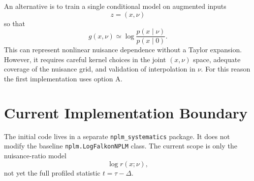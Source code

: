 \documentclass[11pt]{article}
\begin{document}
An alternative is to train a single conditional model on augmented inputs
\begin{equation}
  z=(x,\nu)
\end{equation}
so that
\begin{equation}
  g(x,\nu) \simeq \log \frac{p(x\mid \nu)}{p(x\mid 0)}.
\end{equation}
This can represent nonlinear nuisance dependence without a Taylor expansion.
However, it requires careful kernel choices in the joint $(x,\nu)$ space,
adequate coverage of the nuisance grid, and validation of interpolation in
$\nu$. For this reason the first implementation uses option A.

\section{Current Implementation Boundary}

The initial code lives in a separate \texttt{nplm\_systematics} package. It
does not modify the baseline \texttt{nplm.LogFalkonNPLM} class. The current
scope is only the nuisance-ratio model
\begin{equation}
  \log r(x;\nu),
\end{equation}
not yet the full profiled statistic $t=\tau-\Delta$.
\end{document}
